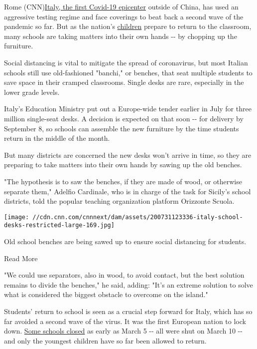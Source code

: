 Rome
(CNN)\href{https://www.cnn.com/2020/03/28/europe/italy-coronavirus-cases-surpass-china-intl/index.html}{Italy,
the first Covid-19 epicenter} outside of China, has used an aggressive
testing regime and face coverings to beat back a second wave of the
pandemic so far. But as the nation's
\href{https://www.cnn.com/2020/05/14/health/children-inflammatory-disease-covid-19-intl/index.html}{children}
prepare to return to the classroom, many schools are taking matters into
their own hands -\/- by chopping up the furniture.

Social distancing is vital to mitigate the spread of coronavirus, but
most Italian schools still use old-fashioned "banchi," or benches, that
seat multiple students to save space in their cramped classrooms. Single
desks are rare, especially in the lower grade levels.

Italy's Education Ministry put out a Europe-wide tender earlier in July
for three million single-seat desks. A decision is expected on that soon
-\/- for delivery by September 8, so schools can assemble the new
furniture by the time students return in the middle of the month.

But many districts are concerned the new desks won't arrive in time, so
they are preparing to take matters into their own hands by sawing up the
old benches.

"The hypothesis is to saw the benches, if they are made of wood, or
otherwise separate them," Adelfio Cardinale, who is in charge of the
task for Sicily's school districts, told the popular teaching
organization platform Orizzonte Scuola.

\texttt{[image: //cdn.cnn.com/cnnnext/dam/assets/200731123336-italy-school-desks-restricted-large-169.jpg]}

Old school benches are being sawed up to ensure social distancing for
students.

Read More

"We could use separators, also in wood, to avoid contact, but the best
solution remains to divide the benches," he said, adding: "It's an
extreme solution to solve what is considered the biggest obstacle to
overcome on the island."

Students' return to school is seen as a crucial step forward for Italy,
which has so far avoided a second wave of the virus. It was the first
European nation to lock down.
\href{https://www.cnn.com/2020/03/04/europe/italy-schools-closures-coronavirus-intl/index.html}{Some
schools closed} as early as March 5 -\/- all were shut on March 10 -\/-
and only the youngest children have so far been allowed to return.

